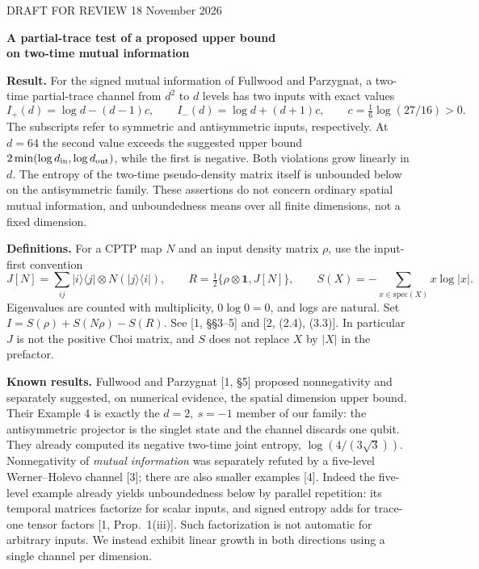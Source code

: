 \documentclass[11pt]{article}
\newcommand{\id}{\mathbf1}
\begin{document}
{\small DRAFT FOR REVIEW \hfill 18 November 2026}
\begin{center}{\Large\bfseries A partial-trace test of a proposed upper bound\\[3pt] on two-time mutual information}\end{center}
\textbf{Result.} For the signed mutual information of Fullwood and Parzygnat, a two-time partial-trace channel from $d^2$ to $d$ levels has two inputs with exact values
\[
 I_+(d)=\log d-(d-1)c,\qquad I_-(d)=\log d+(d+1)c,\qquad c=\tfrac16\log(27/16)>0.\tag{1}
\]
The subscripts refer to symmetric and antisymmetric inputs, respectively. At $d=64$ the second value exceeds the suggested upper bound $2\min(\log d_{\rm in},\log d_{\rm out})$, while the first is negative. Both violations grow linearly in $d$. The entropy of the two-time pseudo-density matrix itself is unbounded below on the antisymmetric family. These assertions do not concern ordinary spatial mutual information, and unboundedness means over all finite dimensions, not a fixed dimension.

\textbf{Definitions.} For a CPTP map $N$ and an input density matrix $\rho$, use the input-first convention
\[
 J[N]=\sum_{ij}|i\rangle\langle j|\otimes N(|j\rangle\langle i|),\qquad
 R=\tfrac12\{\rho\otimes\id,J[N]\},\qquad
 S(X)=-\sum_{x\in\mathrm{spec}(X)}x\log|x|.
\]
Eigenvalues are counted with multiplicity, $0\log0=0$, and logs are natural. Set $I=S(\rho)+S(N\rho)-S(R)$. See [1, \S\S3--5] and [2, (2.4), (3.3)]. In particular $J$ is not the positive Choi matrix, and $S$ does not replace $X$ by $|X|$ in the prefactor.

\textbf{Known results.} Fullwood and Parzygnat [1, \S5] proposed nonnegativity and separately suggested, on numerical evidence, the spatial dimension upper bound. Their Example 4 is exactly the $d=2,\ s=-1$ member of our family: the antisymmetric projector is the singlet state and the channel discards one qubit. They already computed its negative two-time joint entropy, $\log(4/(3\sqrt3))$. Nonnegativity of \emph{mutual information} was separately refuted by a five-level Werner--Holevo channel [3]; there are also smaller examples [4]. Indeed the five-level example already yields unboundedness below by parallel repetition: its temporal matrices factorize for scalar inputs, and signed entropy adds for trace-one tensor factors [1, Prop.~1(iii)]. Such factorization is not automatic for arbitrary inputs. We instead exhibit linear growth in both directions using a single channel per dimension.
\end{document}
